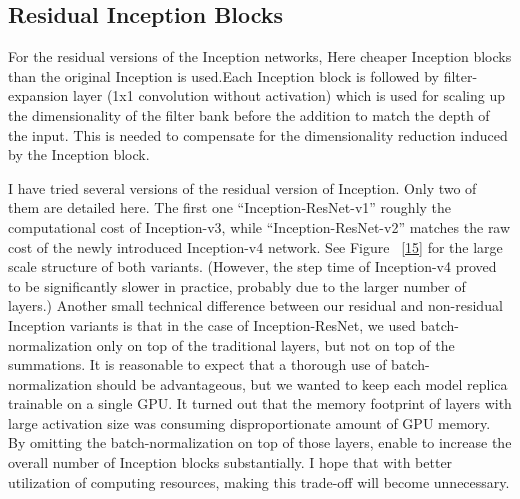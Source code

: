 \documentclass[a4paper,12pt, twoside]{NITKReport}
\begin{document}
\subsection{Residual Inception Blocks}
\par For the residual versions of the Inception networks, Here cheaper Inception  blocks than the original Inception is used.Each Inception block is followed by filter-expansion layer (1x1 convolution  without  activation) which is used  for scaling up the dimensionality of the filter bank before the addition to match the depth of the input. This is needed to compensate for the dimensionality reduction induced by the Inception block.
\par I have tried several versions of the residual version of Inception. Only  two  of them are detailed here. The first one “Inception-ResNet-v1” roughly the computational cost of Inception-v3, while “Inception-ResNet-v2” matches the raw cost of the newly introduced Inception-v4 network. See Figure  ~\ref{15} for the large scale structure of both variants. (However, the step time of Inception-v4 proved to be significantly slower in practice, probably due to the larger number of layers.)
Another  small  technical  difference  between  our  residual and non-residual Inception variants is that in the case of Inception-ResNet, we used batch-normalization only on top of the traditional layers, but not on top of the summations. It is reasonable to expect that a thorough use of batch-normalization  should be advantageous, but we wanted to keep each model replica trainable on a single GPU. It turned out that the memory footprint of layers with large activation size was consuming disproportionate amount of GPU memory. By omitting the batch-normalization on top of those layers, enable to increase the overall number
of Inception blocks substantially. I hope that with better utilization of computing resources, making this trade-off will become unnecessary.\cite{DBLP:journals/corr/SzegedyIV16}
\end{document}
